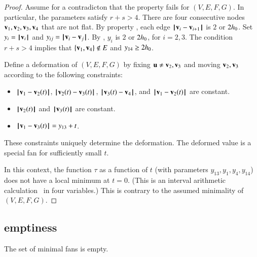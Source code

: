 \begin{proof} 
Assume for a contradicton that the property fails for $(V,E,F,G)$.
In particular, the parameters satisfy $r+s>4$.
There are four consecutive nodes $\v_1,\v_2,\v_3,\v_4$ that are not flat.   By property ,   each edge $\norm{\v_i}{\v_{i+1}}$ is $2$ or $2\hm$. Set $y_i = \normo{\v_i}$ and $y_{ij} = \norm{\v_i}{\v_j}$.   By , $y_i$ is $2$ or $2\hm$, for $i=2,3$.   The condition $r+s>4$ implies that $\{\v_1,\v_4\}\not\in E$ and $y_{14}\ge 2\hm$.

Define a deformation of $(V,E,F,G)$ by fixing $\u\ne \v_2,\v_3$ and moving $\v_2,\v_3$ according to the following constraints:
\begin{itemize}
\item $\norm{\v_1}{\v_2(t)}$, $\norm{\v_2(t)}{\v_3(t)}$, $\norm{\v_3(t)}{\v_4}$, and $\norm{\v_1}{\v_2(t)}$ are constant.
\item $\normo{\v_2(t)}$ and $\normo{\v_3(t)}$ are constant.
\item $\norm{\v_1}{\v_3(t)} = y_{13} + t$.
\end{itemize}
These constraints uniquely determine the deformation. The deformed value is a special fan for sufficiently small $t$.

In this context, the function $\tau$ as a function of $t$ (with parameters $y_{13},y_1,y_4,y_{14}$) does not have a local minimum at $t=0$.
(This is an interval arithmetic calculation~\cite[cc:qua]{hales:2009:nonlinear} in four variables.) %
This is contrary to the assumed minimality of $(V,E,F,G)$.
\end{proof}




\subsection{emptiness}

\begin{lemma}\label{lemma:min-empty}  
The set of minimal fans is empty.
\end{lemma}

